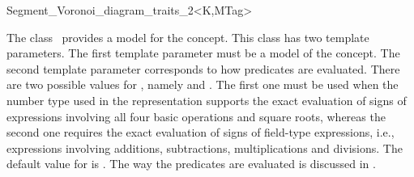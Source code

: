 


\begin{ccRefClass}{Segment_Voronoi_diagram_traits_2<K,MTag>}


\ccDefinition
  
The class \ccRefName\ provides a model for the
 concept.
This class has two template parameters. The first template parameter
must be a model of the  concept. The second template
parameter corresponds to how predicates are evaluated. There are two
possible values for , namely  and
. The first one must be used when the number type
used in the representation supports the exact evaluation of signs of
expressions involving all four basic operations and square roots,
whereas the second one requires the exact evaluation of signs of
field-type expressions, i.e., expressions involving additions,
subtractions, multiplications and divisions. The default value for
 is .
%
The way the predicates are evaluated is discussed in
\cite{b-ecvdl-96,cgal:k-reisv-04}.



\ccIsModel
{}\\
\\
\\

\ccTypes
{}


\end{ccRefClass}

